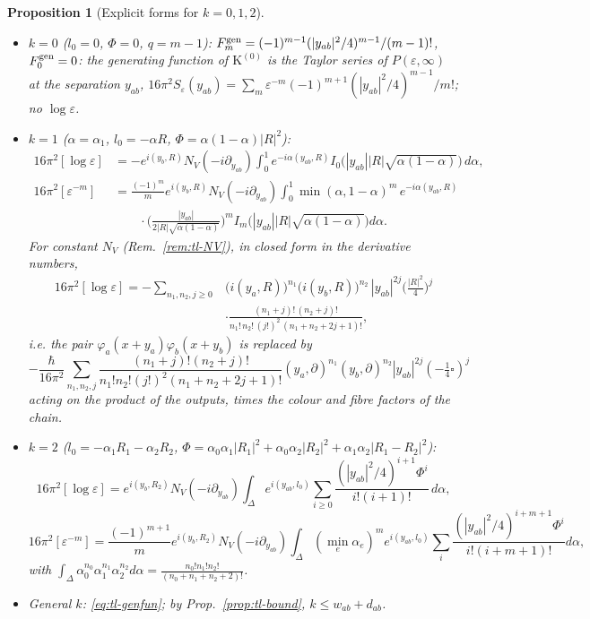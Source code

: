 \documentclass[11pt]{article}
\numberwithin{equation}{section}
\theoremstyle{plain}
\newtheorem{proposition}[theorem]{Proposition}
\theoremstyle{definition}
\begin{document}
\begin{proposition}[Explicit forms for $k=0,1,2$]
\label{prop:tl-bubble}
\begin{itemize}
\item $k=0$ ($l_0=0$, $\Phi=0$, $q=m-1$): $F_m^{\rm gen}=(-1)^{m-1}(|y_{ab}|^2/4)^{m-1}/(m-1)!$, $F_0^{\rm gen}=0$: the generating function of $\mathrm K^{(0)}$ is the Taylor series of $P(\varepsilon,\infty)$ at the separation $y_{ab}$, $16\pi^2S_\varepsilon(y_{ab})=\sum_m\varepsilon^{-m}(-1)^{m+1}(|y_{ab}|^2/4)^{m-1}/m!$; no $\log\varepsilon$.
\item $k=1$ ($\alpha=\alpha_1$, $l_0=-\alpha R$, $\Phi=\alpha(1-\alpha)|R|^2$):
\[
\begin{aligned}
16\pi^2[\log\varepsilon]&=-e^{i(y_b,R)}N_V(-i\partial_{y_{ab}})\int_0^1e^{-i\alpha(y_{ab},R)}I_0\big(|y_{ab}||R|\sqrt{\alpha(1-\alpha)}\big)\,d\alpha,\\
16\pi^2[\varepsilon^{-m}]&=\frac{(-1)^m}me^{i(y_b,R)}N_V(-i\partial_{y_{ab}})\int_0^1\min(\alpha,1-\alpha)^m\,e^{-i\alpha(y_{ab},R)}\\ &\qquad\cdot\Big(\frac{|y_{ab}|}{2|R|\sqrt{\alpha(1-\alpha)}}\Big)^mI_m\big(|y_{ab}||R|\sqrt{\alpha(1-\alpha)}\big)d\alpha .
\end{aligned}
\]
For constant $N_V$ (Rem.~\ref{rem:tl-NV}), in closed form in the derivative numbers,
\begin{equation}
\begin{aligned}16\pi^2[\log\varepsilon]=-\sum_{n_1,n_2,j\ge0}&\big(i(y_a,R)\big)^{n_1}\big(i(y_b,R)\big)^{n_2}\,|y_{ab}|^{2j}\Big(\frac{|R|^2}4\Big)^j\\ &\cdot\frac{(n_1+j)!\,(n_2+j)!}{n_1!\,n_2!\,(j!)^2\,(n_1+n_2+2j+1)!},\end{aligned}
\label{eq:tl-bubbleclosed}
\end{equation}
i.e. the pair $\varphi_a(x+y_a)\varphi_b(x+y_b)$ is replaced by
\[
-\frac{\hbar}{16\pi^2}\sum_{n_1,n_2,j}\frac{(n_1+j)!(n_2+j)!}{n_1!n_2!(j!)^2(n_1+n_2+2j+1)!}(y_a,\partial)^{n_1}(y_b,\partial)^{n_2}|y_{ab}|^{2j}(-\tfrac14\square)^j
\]
acting on the product of the outputs, times the colour and fibre factors of the chain.
\item $k=2$ ($l_0=-\alpha_1R_1-\alpha_2R_2$, $\Phi=\alpha_0\alpha_1|R_1|^2+\alpha_0\alpha_2|R_2|^2+\alpha_1\alpha_2|R_1-R_2|^2$):
\[
16\pi^2[\log\varepsilon]=e^{i(y_b,R_2)}N_V(-i\partial_{y_{ab}})\int_\Delta e^{i(y_{ab},l_0)}\sum_{i\ge0}\frac{(|y_{ab}|^2/4)^{i+1}\Phi^i}{i!(i+1)!}\,d\alpha ,\]\[16\pi^2[\varepsilon^{-m}]=\frac{(-1)^{m+1}}me^{i(y_b,R_2)}N_V(-i\partial_{y_{ab}})\int_\Delta(\min_e\alpha_e)^me^{i(y_{ab},l_0)}\sum_i\frac{(|y_{ab}|^2/4)^{i+m+1}\Phi^i}{i!(i+m+1)!}d\alpha,
\]
with $\int_\Delta\alpha_0^{n_0}\alpha_1^{n_1}\alpha_2^{n_2}d\alpha=\frac{n_0!n_1!n_2!}{(n_0+n_1+n_2+2)!}$.
\item General $k$: \eqref{eq:tl-genfun}; by Prop.~\ref{prop:tl-bound}, $k\le w_{ab}+d_{ab}$.
\end{itemize}
\end{proposition}
\end{document}
